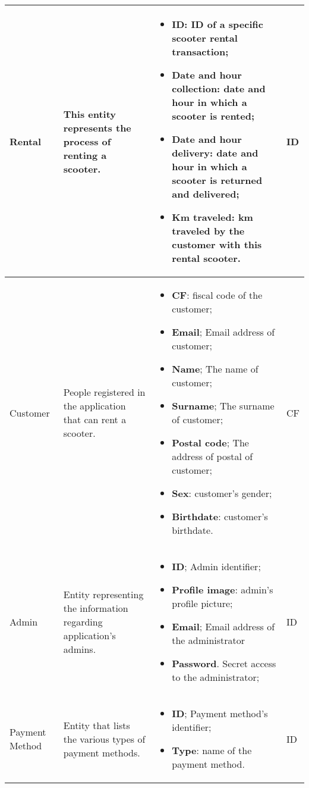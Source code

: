 \begin{longtable}{|p{}|p{} |p{}|p{} |}
Rental & This entity represents the process of renting a scooter. & 
\begin{itemize}
    \vspace{-1em}
    \item \textbf{ID}: ID of a specific scooter rental transaction;
    \item \textbf{Date and hour collection}: date and hour in which a scooter is rented;
    \item \textbf{Date and hour delivery}: date and hour in which a scooter is returned  and delivered;
    \item \textbf{Km traveled}: km traveled by the customer with this rental scooter.
 \end{itemize} & ID \\\hline

Customer & People registered in the application that can rent a scooter. & 
\begin{itemize}
    \vspace{-1em}
    \item \textbf{CF}: fiscal code of the customer;
    \item \textbf{Email}; Email address of customer;
    \item \textbf{Name}; The name of customer;
    \item \textbf{Surname}; The surname of customer;
    \item \textbf{Postal code}; The address of postal of customer;
    \item \textbf{Sex}: customer's gender;
    \item \textbf{Birthdate}: customer's birthdate. 
\end{itemize} & CF \\\hline

Admin & Entity representing the information regarding application's admins. & 
\begin{itemize}
    \vspace{-1em}
    \item \textbf{ID}; Admin identifier; 
    \item \textbf{Profile image}: admin's profile picture;
    \item \textbf{Email}; Email address of the  administrator
    \item \textbf{Password}. Secret access to the administrator; 
\end{itemize} & ID \\\hline

Payment Method & Entity that lists the various types of payment methods. & 
\begin{itemize}
    \vspace{-1em}
    \item \textbf{ID}; Payment method's identifier; 
    \item \textbf{Type}: name of the payment method.
\end{itemize} & ID \\\hline


\end{longtable}
